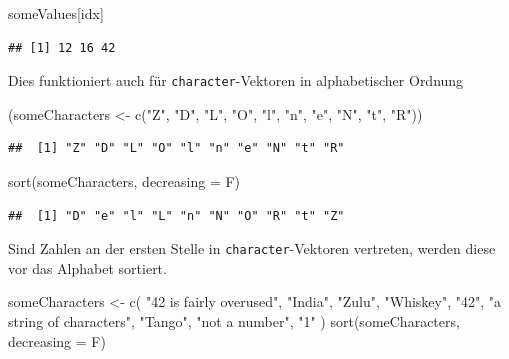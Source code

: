 \documentclass[
]{book}
\newenvironment{Shaded}{\begin{snugshade}}{\end{snugshade}}
\newcommand{\AttributeTok}[1]{\textcolor[rgb]{0.77,0.63,0.00}{#1}}
\newcommand{\FunctionTok}[1]{\textcolor[rgb]{0.00,0.00,0.00}{#1}}
\newcommand{\NormalTok}[1]{#1}
\newcommand{\OtherTok}[1]{\textcolor[rgb]{0.56,0.35,0.01}{#1}}
\newcommand{\StringTok}[1]{\textcolor[rgb]{0.31,0.60,0.02}{#1}}
\begin{document}
\begin{Shaded}
\begin{Highlighting}[]
\NormalTok{someValues[idx]}
\end{Highlighting}
\end{Shaded}

\begin{verbatim}
## [1] 12 16 42
\end{verbatim}

Dies funktioniert auch für \texttt{character}-Vektoren in alphabetischer Ordnung

\begin{Shaded}
\begin{Highlighting}[]
\NormalTok{(someCharacters }\OtherTok{\textless{}{-}}  \FunctionTok{c}\NormalTok{(}\StringTok{"Z"}\NormalTok{, }\StringTok{"D"}\NormalTok{, }\StringTok{"L"}\NormalTok{, }\StringTok{"O"}\NormalTok{, }\StringTok{"l"}\NormalTok{, }\StringTok{"n"}\NormalTok{, }\StringTok{"e"}\NormalTok{, }\StringTok{"N"}\NormalTok{, }\StringTok{"t"}\NormalTok{, }\StringTok{"R"}\NormalTok{))}
\end{Highlighting}
\end{Shaded}

\begin{verbatim}
##  [1] "Z" "D" "L" "O" "l" "n" "e" "N" "t" "R"
\end{verbatim}

\begin{Shaded}
\begin{Highlighting}[]
\FunctionTok{sort}\NormalTok{(someCharacters, }\AttributeTok{decreasing =}\NormalTok{ F)}
\end{Highlighting}
\end{Shaded}

\begin{verbatim}
##  [1] "D" "e" "l" "L" "n" "N" "O" "R" "t" "Z"
\end{verbatim}

\small

Sind Zahlen an der ersten Stelle in \texttt{character}-Vektoren vertreten, werden diese vor das Alphabet sortiert.

\begin{Shaded}
\begin{Highlighting}[]
\NormalTok{someCharacters }\OtherTok{\textless{}{-}} \FunctionTok{c}\NormalTok{(}
  \StringTok{"42 is fairly overused"}\NormalTok{,}
  \StringTok{"India"}\NormalTok{,}
  \StringTok{"Zulu"}\NormalTok{,}
  \StringTok{"Whiskey"}\NormalTok{,}
  \StringTok{"42"}\NormalTok{,}
  \StringTok{"a string of characters"}\NormalTok{,}
  \StringTok{"Tango"}\NormalTok{,}
  \StringTok{"not a number"}\NormalTok{,}
  \StringTok{"1"}
\NormalTok{)}
\FunctionTok{sort}\NormalTok{(someCharacters, }\AttributeTok{decreasing =}\NormalTok{ F)}
\end{Highlighting}
\end{Shaded}
\end{document}
